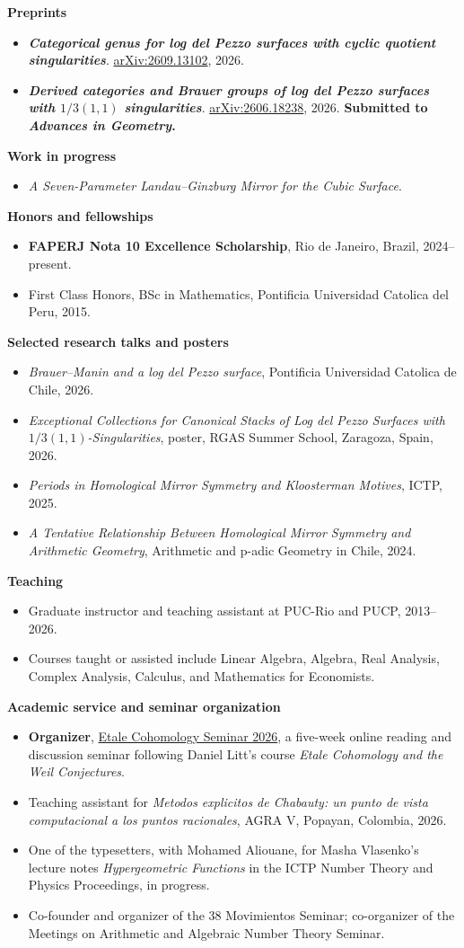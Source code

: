 \documentclass[10pt,a4paper]{article}
\newcommand{\cvsection}[1]{%
  \vspace{6pt}
  {\large\bfseries\color{cvteal}#1}\par
  \vspace{1pt}{\color{cvrule}\hrule height 0.5pt}\vspace{3pt}
}
\newcommand{\cvitem}[1]{\item #1}
\newcommand{\submissiontag}{\textbf{\color{cvteal}Submitted to \emph{Advances in Geometry}.}}
\begin{document}
\cvsection{Preprints}
\begin{itemize}
  \cvitem{\textbf{\emph{Categorical genus for log del Pezzo surfaces with cyclic quotient singularities}}. \href{https://arxiv.org/abs/2609.13102}{arXiv:2609.13102}, 2026.}
  \cvitem{\textbf{\emph{Derived categories and Brauer groups of log del Pezzo surfaces with \(1/3(1,1)\) singularities}}. \href{https://arxiv.org/abs/2606.18238}{arXiv:2606.18238}, 2026. \submissiontag}
\end{itemize}

\cvsection{Work in progress}
\begin{itemize}
  \cvitem{\emph{A Seven-Parameter Landau--Ginzburg Mirror for the Cubic Surface}.}
\end{itemize}

\cvsection{Honors and fellowships}
\begin{itemize}
  \cvitem{\textbf{FAPERJ Nota 10 Excellence Scholarship}, Rio de Janeiro, Brazil, 2024--present.}
  \cvitem{First Class Honors, BSc in Mathematics, Pontificia Universidad Catolica del Peru, 2015.}
\end{itemize}

\cvsection{Selected research talks and posters}
\begin{itemize}
  \cvitem{\emph{Brauer--Manin and a log del Pezzo surface}, Pontificia Universidad Catolica de Chile, 2026.}
  \cvitem{\emph{Exceptional Collections for Canonical Stacks of Log del Pezzo Surfaces with \(1/3(1,1)\)-Singularities}, poster, RGAS Summer School, Zaragoza, Spain, 2026.}
  \cvitem{\emph{Periods in Homological Mirror Symmetry and Kloosterman Motives}, ICTP, 2025.}
  \cvitem{\emph{A Tentative Relationship Between Homological Mirror Symmetry and Arithmetic Geometry}, Arithmetic and p-adic Geometry in Chile, 2024.}
\end{itemize}

\cvsection{Teaching}
\begin{itemize}
  \cvitem{Graduate instructor and teaching assistant at PUC-Rio and PUCP, 2013--2026.}
  \cvitem{Courses taught or assisted include Linear Algebra, Algebra, Real Analysis, Complex Analysis, Calculus, and Mathematics for Economists.}
\end{itemize}

\newpage
\cvsection{Academic service and seminar organization}
\begin{itemize}
  \cvitem{\textbf{Organizer}, \href{https://alequisgs.github.io/etale-cohomology-seminar-2026-/}{Etale Cohomology Seminar 2026}, a five-week online reading and discussion seminar following Daniel Litt's course \emph{Etale Cohomology and the Weil Conjectures}.}
  \cvitem{Teaching assistant for \emph{Metodos explicitos de Chabauty: un punto de vista computacional a los puntos racionales}, AGRA V, Popayan, Colombia, 2026.}
  \cvitem{One of the typesetters, with Mohamed Aliouane, for Masha Vlasenko's lecture notes \emph{Hypergeometric Functions} in the ICTP Number Theory and Physics Proceedings, in progress.}
  \cvitem{Co-founder and organizer of the 38 Movimientos Seminar; co-organizer of the Meetings on Arithmetic and Algebraic Number Theory Seminar.}
\end{itemize}
\end{document}

